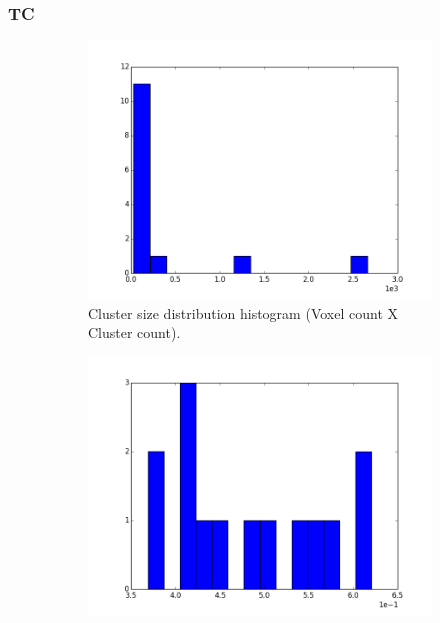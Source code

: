 \documentclass[a4paper,11pt]{report}
\begin{document}
    \subsubsection{TC}
    \begin{figure}[!ht]
      \centering

      \begin{subfigure}[t]{.49\textwidth}
        \includegraphics[width=1\linewidth]{img/histograms/tc_clustered_fa_mask_region_sizes_hist.png}
        \caption{Cluster size distribution histogram (Voxel count X Cluster count).}
        \label{subfig:fa_hist_region}
      \end{subfigure}\hfill%
      \begin{subfigure}[t]{.49\textwidth}
        \includegraphics[width=1\linewidth]{img/histograms/tc_clustered_fa_mask_fa_means_hist.png}

\end{subfigure}
\end{figure}
\end{document}
